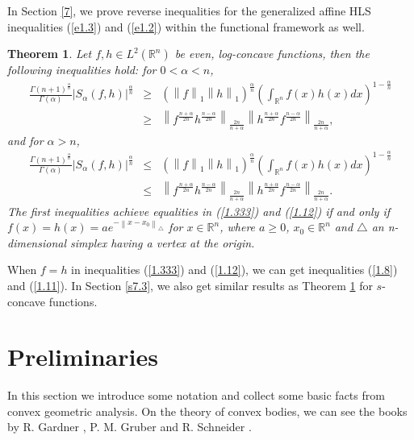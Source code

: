 \documentclass[preprint,12pt]{elsarticle}
\newtheorem{thm}{Theorem}
\begin{document}
	In Section \ref{7}, we prove reverse inequalities for the generalized affine HLS inequalities (\ref{e1.3}) and (\ref{e1.2}) within the functional framework as well.
	
	\begin{thm}\label{1.3}
		Let $f ,h\in L^{2}\left ( \mathbb{R}^n  \right )$ be even,  log-concave functions, then the following inequalities hold:
		for $0< \alpha <  n$,
		\begin{eqnarray}\label{1.333}
			\frac{\Gamma \left ( n+1 \right )^{\frac{\alpha }{n} }  }{\Gamma \left ( \alpha  \right ) }\left | S_{\alpha }\left ( f,h \right )   \right |^{\frac{\alpha }{n} }&\ge&  \left ( \left \| f \right \|_{1}\left \| h \right \|_{1}    \right )^{\frac{\alpha }{n} }\left ( \int_{\mathbb{R}^n }f\left ( x \right )h\left ( x \right )dx    \right )^{1-\frac{\alpha }{n} }\nonumber\\
			&\ge& {\left \| {f}^{\frac{n+\alpha }{2n}} {h}^{\frac{n-\alpha }{2n}}\right \|}_{\frac{2n }{n+\alpha}}{\left \| {h}^{\frac{n+\alpha }{2n}} {f}^{\frac{n-\alpha }{2n}}\right \|}_{\frac{2n }{n+\alpha}},
		\end{eqnarray}
		and for $\alpha>  n$,
		\begin{eqnarray}\label{1.12}
			\frac{\Gamma \left ( n+1 \right )^{\frac{\alpha }{n} }  }{\Gamma \left ( \alpha  \right ) }\left | S_{\alpha }\left ( f,h \right )   \right |^{\frac{\alpha }{n} }&\le& \left ( \left \| f \right \|_{1}\left \| h \right \|_{1}    \right )^{\frac{\alpha }{n} }\left ( \int_{\mathbb{R}^n }f\left ( x \right )h\left ( x \right )dx    \right )^{1-\frac{\alpha }{n} }\nonumber\\
			&\le&  {\left \| {f}^{\frac{n+\alpha }{2n}} {h}^{\frac{n-\alpha }{2n}}\right \|}_{\frac{2n }{n+\alpha}}{\left \| {h}^{\frac{n+\alpha }{2n}} {f}^{\frac{n-\alpha }{2n}}\right \|}_{\frac{2n }{n+\alpha}}. 
		\end{eqnarray}
		The first inequalities achieve equalities in (\ref{1.333}) and (\ref{1.12}) if and only if $f\left ( x \right )=h\left ( x \right )=ae^{-\left \| x-x_{0}  \right \|_{\bigtriangleup }  }$ for $x\in \mathbb{R}^n  $, where $a \ge 0$, $x_{0}\in \mathbb{R}^n $ and $\bigtriangleup $ an n-dimensional simplex having a vertex at the origin.
		\end{thm}
		When $f=h$ in inequalities (\ref{1.333}) and (\ref{1.12}), we can get inequalities (\ref{1.8}) and (\ref{1.11}). In Section \ref{s7.3}, we also get similar results as Theorem \ref{1.3} for $s$-concave functions.

\section{Preliminaries}\label{s2}
	In this section we introduce some notation and collect some basic facts from convex geometric analysis. On the theory of convex bodies, we can see the books by R. Gardner  \cite{R. Gardner06}, P. M. Gruber \cite{PG07} and R. Schneider \cite{Schneider14}.
	
\end{document}
